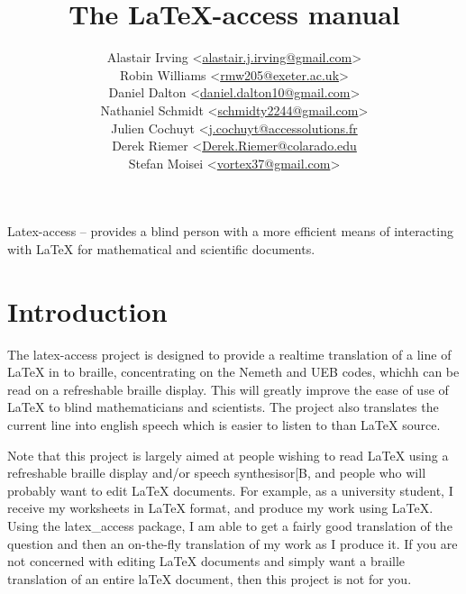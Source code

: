 \documentclass[12pt,a4paper]{report}
\begin{document}
\title{The LaTeX-access manual}
\author{Alastair Irving <\href{mailto:alastair.j.irving@gmail.com}{alastair.j.irving@gmail.com}>\\
  Robin  Williams <\href{mailto:rmw205@exeter.ac.uk}{rmw205@exeter.ac.uk}>\\
  Daniel Dalton <\href{mailto:<daniel.dalton10@gmail.com}{daniel.dalton10@gmail.com}>\\
  Nathaniel Schmidt <\href{mailto:schmidty2244@gmail.com}{schmidty2244@gmail.com}>\\
  Julien Cochuyt <\href{mailto:j.cochuyt@accessolutions.fr}{j.cochuyt@accessolutions.fr}\\
  Derek Riemer <\href{mailto:Derek.Riemer@colorado.edu}{Derek.Riemer@colarado.edu}\\
  Stefan Moisei <\href{mailto:vortex37@gmail.com}{vortex37@gmail.com}>}
\maketitle
\tableofcontents

Latex-access -- provides a blind person with a more efficient means of
interacting with LaTeX for mathematical and scientific documents.

\chapter{Introduction}
\label{ch-introduction}

The latex-access project is designed to provide a realtime
translation of a line of LaTeX in to braille, concentrating
on the Nemeth and UEB codes, whichh can be read on a refreshable braille
display. This will greatly improve the ease of use of
LaTeX to blind mathematicians and scientists. The project also
translates the current line into english speech which is
easier to listen to than LaTeX source.

Note that this project is largely aimed at people wishing
to read LaTeX using a refreshable braille display and/or
speech synthesisor[B, and people who will probably
want to edit LaTeX documents. For example, as a
university student,
I receive my worksheets in LaTeX format, and
produce my work using LaTeX. Using the latex\_access
package, I am able to
get a fairly good translation of the question
and then an on-the-fly translation of my work as
I produce it. If you are
not concerned with editing LaTeX documents
and simply want a braille translation of an
entire laTeX document, then this
project is not for you.
\end{document}
